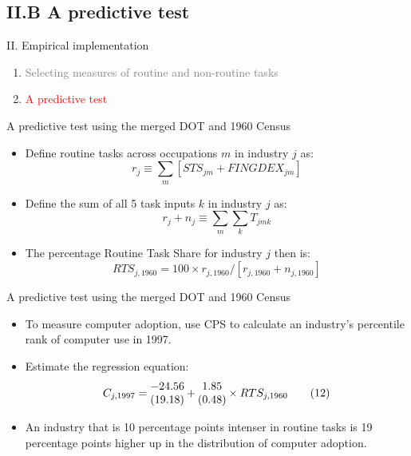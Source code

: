 \documentclass[notes=show]{beamer}
\begin{document}
\subsection{II.B A predictive test}

\begin{frame}{II. Empirical implementation}
\begin{enumerate}
\item[\textcolor{gray}{II.A}] \textcolor{gray}{Selecting measures of routine and non-routine tasks} \bigskip
\item[\textcolor{red}{II.B}]  \textcolor{red}{A predictive test} \bigskip
\end{enumerate}
\end{frame}

\begin{frame}{A predictive test using the merged DOT and 1960 Census}
\begin{itemize}
\item Define routine tasks across occupations $m$ in industry $j$ as:
\[
r_{j} \equiv \sum_{m} [STS_{jm} + FINGDEX_{jm}]
\]
\item Define the sum of all 5 task inputs $k$ in industry $j$ as:
\[
r_{j} + n_{j} \equiv \sum_{m} \sum_{k} T_{jmk}
\]
\item The percentage Routine Task Share for industry $j$ then is:
\[
RTS_{j,1960}=100 \times r_{j,1960}/[r_{j,1960} + n_{j,1960}]
\]
\end{itemize}
\end{frame}

\begin{frame}{A predictive test using the merged DOT and 1960 Census}
\begin{itemize}
\item To measure computer adoption, use CPS to calculate an industry's percentile rank of computer use in 1997. \medskip
\item Estimate the regression equation:
\[
\def\stacktype{L}
C_{j,1997} = 
\begin{matrix}
-24.56 \\
(19.18)
\end{matrix}
+ 
\begin{matrix}
1.85 \\
(0.48)
\end{matrix}
\times RTS_{j,1960} \tag{12}  \label{eq12}
\]
\item An industry that is 10 percentage points intenser in routine tasks is 19 percentage points higher up in the distribution of computer adoption.
\end{itemize}
\end{frame}
\end{document}
